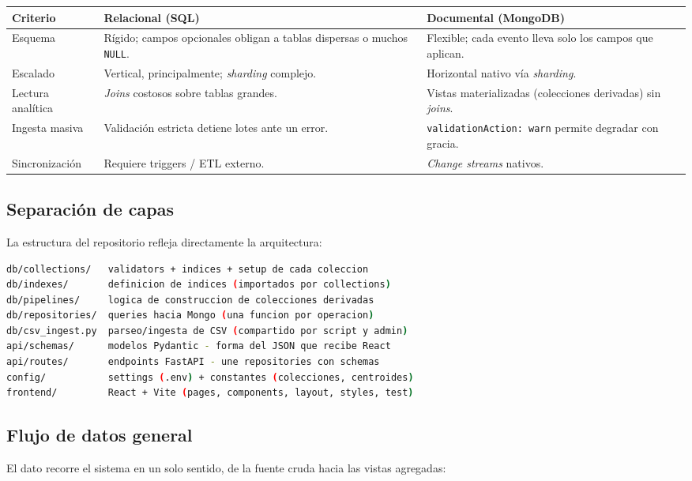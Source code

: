 \documentclass[12pt, letterpaper]{article}
\newcommand{\code}[1]{\texttt{#1}}
\begin{document}
\begin{center}
\begin{tabular}{@{}L{3.2cm}L{5.3cm}L{5.3cm}@{}}
\toprule
\textbf{Criterio} & \textbf{Relacional (SQL)} & \textbf{Documental (MongoDB)} \\
\midrule
Esquema & Rígido; campos opcionales obligan a tablas dispersas o muchos \code{NULL}. & Flexible; cada evento lleva solo los campos que aplican. \\
Escalado & Vertical, principalmente; \emph{sharding} complejo. & Horizontal nativo vía \emph{sharding}. \\
Lectura analítica & \emph{Joins} costosos sobre tablas grandes. & Vistas materializadas (colecciones derivadas) sin \emph{joins}. \\
Ingesta masiva & Validación estricta detiene lotes ante un error. & \code{validationAction: warn} permite degradar con gracia. \\
Sincronización & Requiere triggers / ETL externo. & \emph{Change streams} nativos. \\
\bottomrule
\end{tabular}
\end{center}

\subsection{Separación de capas}
La estructura del repositorio refleja directamente la arquitectura:

\begin{lstlisting}[language=bash,caption={Organización por responsabilidades}]
db/collections/   validators + indices + setup de cada coleccion
db/indexes/       definicion de indices (importados por collections)
db/pipelines/     logica de construccion de colecciones derivadas
db/repositories/  queries hacia Mongo (una funcion por operacion)
db/csv_ingest.py  parseo/ingesta de CSV (compartido por script y admin)
api/schemas/      modelos Pydantic - forma del JSON que recibe React
api/routes/       endpoints FastAPI - une repositories con schemas
config/           settings (.env) + constantes (colecciones, centroides)
frontend/         React + Vite (pages, components, layout, styles, test)
\end{lstlisting}

\subsection{Flujo de datos general}
El dato recorre el sistema en un solo sentido, de la fuente cruda hacia las
vistas agregadas:
\end{document}

